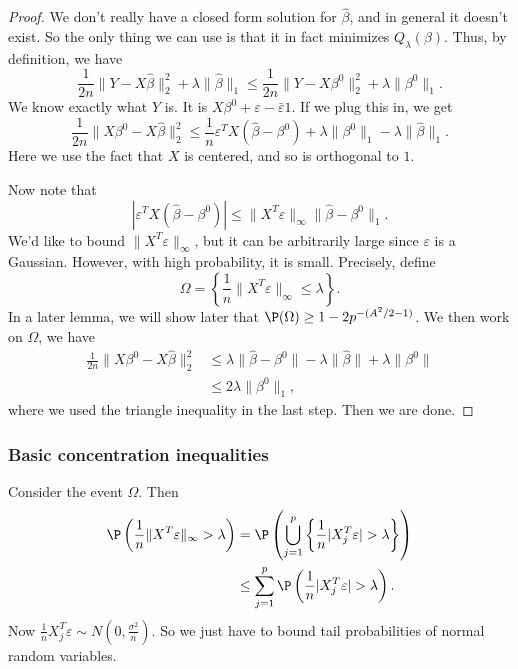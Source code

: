 \documentclass[a4paper]{article}
\begin{document}
\begin{proof}
  We don't really have a closed form solution for $\hat{\beta}$, and in general it doesn't exist. So the only thing we can use is that it in fact minimizes $Q_\lambda(\beta)$. Thus, by definition, we have
  \[
    \frac{1}{2n} \|Y - X \hat{\beta}\|_2^2 + \lambda \|\hat{\beta}\|_1 \leq \frac{1}{2n} \|Y - X \beta^0\|^2_2 + \lambda \|\beta^0\|_1.
  \]
  We know exactly what $Y$ is. It is $X \beta^0 + \varepsilon - \bar{\varepsilon} 1$. If we plug this in, we get
  \[
    \frac{1}{2n} \|X \beta^0 - X \hat{\beta}\|_2^2 \leq \frac{1}{n} \varepsilon^T X(\hat{\beta} - \beta^0) + \lambda \|\beta^0\|_1 - \lambda \|\hat{\beta}\|_1.
  \]
  Here we use the fact that $X$ is centered, and so is orthogonal to $1$.

  Now note that
  \[
    |\varepsilon^T X (\hat{\beta} - \beta^0)| \leq \|X^T \varepsilon \|_\infty \|\hat{\beta} - \beta^0\|_1.
  \]
  We'd like to bound $\|X^T \varepsilon \|_\infty$, but it can be arbitrarily large since $\varepsilon$ is a Gaussian. However, with high probability, it is small. Precisely, define
  \[
    \Omega = \left\{\frac{1}{n} \|X^T \varepsilon \|_\infty \leq \lambda\right\}.
  \]
  In a later lemma, we will show later that $\P(\Omega) \geq 1 - 2 p^{-(A^2/2 - 1)}$. We then work on $\Omega$, we have
  \begin{align*}
    \frac{1}{2n} \|X \beta^0 - X \hat{\beta}\|^2_2 &\leq \lambda \|\hat{\beta} - \beta^0\| - \lambda \|\hat{\beta}\| + \lambda \|\beta^0\|\\
    &\leq 2 \lambda \|\beta^0\|_1,
  \end{align*}
  where we used the triangle inequality in the last step. Then we are done.
\end{proof}

\subsubsection*{Basic concentration inequalities}
Consider the event $\Omega$. Then
\begin{align*}
  \P\left(\frac{1}{n} \|X^T \varepsilon\|_\infty > \lambda\right) &= \P\left(\bigcup_{j = 1}^p \left\{\frac{1}{n}|X_j^T \varepsilon| > \lambda\right\}\right)\\
  &\leq \sum_{j = 1}^p \P\left(\frac{1}{n} |X_j^T \varepsilon| > \lambda\right).
\end{align*}
Now $\frac{1}{n} X_j^T \varepsilon \sim N(0, \frac{\sigma^2}{n})$. So we just have to bound tail probabilities of normal random variables.
\end{document}
